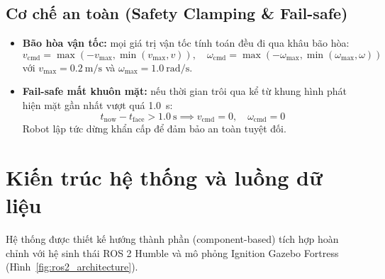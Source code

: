 \subsection{Cơ chế an toàn (Safety Clamping \& Fail-safe)}
\begin{itemize}
    \item \textbf{Bão hòa vận tốc:} mọi giá trị vận tốc tính toán đều đi qua khâu bão hòa:
    \begin{equation}
        v_{\text{cmd}} = \max(-v_{\max}, \min(v_{\max}, v)), \quad \omega_{\text{cmd}} = \max(-\omega_{\max}, \min(\omega_{\max}, \omega))
    \end{equation}
    với $v_{\max} = \SI{0.2}{\meter/\second}$ và $\omega_{\max} = \SI{1.0}{\radian/\second}$.
    \item \textbf{Fail-safe mất khuôn mặt:} nếu thời gian trôi qua kể từ khung hình phát hiện mặt gần nhất vượt quá \SI{1.0}{\second}:
    \begin{equation}
        t_{\text{now}} - t_{\text{face}} > \SI{1.0}{\second} \implies v_{\text{cmd}} = 0, \quad \omega_{\text{cmd}} = 0
    \end{equation}
    Robot lập tức dừng khẩn cấp để đảm bảo an toàn tuyệt đối.
\end{itemize}

\section{Kiến trúc hệ thống và luồng dữ liệu}

Hệ thống được thiết kế hướng thành phần (component-based) tích hợp hoàn chỉnh với hệ sinh thái ROS 2 Humble và mô phỏng Ignition Gazebo Fortress (Hình~\ref{fig:ros2_architecture}).

